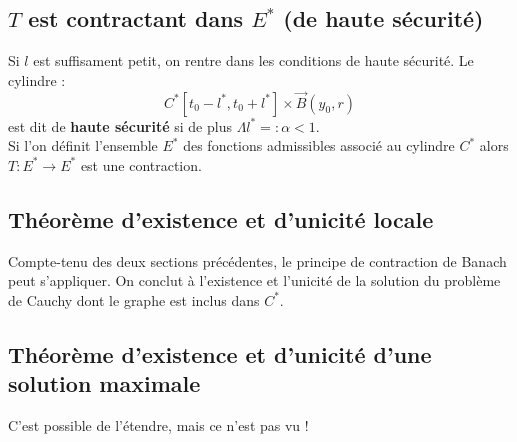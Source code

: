 \subsection{$T$ est contractant dans $E^*$ (de haute sécurité)}
Si $l$ est suffisament petit, on rentre dans les conditions de haute sécurité. Le 
cylindre :
\begin{equation}
	C^* [t_0-l^*, t_0+l^*]\times\vec{B}(y_0,r)
\end{equation}
est dit de \textbf{haute sécurité} si de plus $\Lambda l^* =: \alpha < 1$.\\
Si l'on définit l'ensemble $E^*$ des fonctions admissibles associé au cylindre 
$C^*$ alors $T : E^* \rightarrow E^*$ est une contraction.
	
\subsection{Théorème d'existence et d'unicité locale}
Compte-tenu des deux sections précédentes, le principe de contraction de Banach 
peut s'appliquer. On conclut à l'existence et l'unicité de la solution du problème 
de Cauchy dont le graphe est inclus dans $C^*$.
	
	
	
\subsection{Théorème d'existence et d'unicité d'une solution maximale}
C'est possible de l'étendre, mais ce n'est pas vu !
	
	
	
	
	
	
	
	
	
	
	
	
	
	
	
	
	
	
	
	
	
	
	
	
	
	
	
	
	
	
	
	
